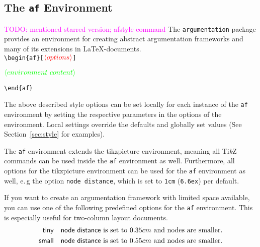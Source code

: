 \documentclass[headings=normal]{scrartcl}
\newcommand{\todo}[1]{\textcolor{magenta}{TODO: #1}} %
\newcommand{\tikzname}{Ti\emph{k}Z\xspace}
\newcommand{\argumentation}{\texttt{argumentation}\xspace}
\newcommand{\opt}[2][red]{\ensuremath{\textcolor{#1}{\langle #2\rangle}}}
\newtheorem{example}{Example}
\begin{document}
\subsection{The \texttt{af} Environment}\label{sec:af}
\todo{mentioned starred version; afstyle command}
The \argumentation package provides an environment for creating abstract argumentation frameworks and many of its extensions in \LaTeX-documents.\\

\vspace{-0.2cm}
\noindent
\verb|\begin{af}[|\opt{options}\verb|]|

\opt[green]{environment~content}

\noindent
\verb|\end{af}|

\begin{list}{}{\leftmargin=\parindent\rightmargin=0pt}
    \item
    The above described style options can be set locally for each instance of the \texttt{af} environment by setting the respective parameters in the options of the environment.
    Local settings override the defaults and globally set values (See Section~\ref{sec:style} 
 for examples).
    
    The \texttt{af} environment extends the \textsf{tikzpicture} environment, meaning all \tikzname commands can be used inside the \texttt{af} environment as well.
    Furthermore, all options for the \textsf{tikzpicture} environment can be used for the \texttt{af} environment as well, e.\,g the option \verb|node distance|, which is set to \verb|1cm| (\verb|6.6ex|) per default.

    If you want to create an argumentation framework with limited space available, you can use one of the following predefined options for the \texttt{af} environment. 
    This is especially useful for two-column layout documents.
    \begin{align*}
        \mathsf{tiny} &\quad \text{\textsf{node distance} is set to $0.35cm$ and nodes are smaller.}\\
        \mathsf{small} &\quad \text{\textsf{node distance} is set to $0.55cm$ and nodes are smaller.}
    \end{align*}

\end{list}
\end{document}
